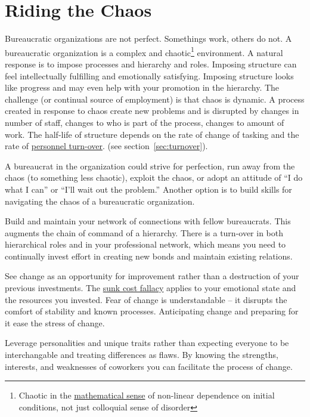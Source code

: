 \section{Riding the Chaos}

Bureaucratic organizations are not perfect. Somethings work, others do not. A bureaucratic organization is a complex and chaotic\footnote{Chaotic in the \href{https://en.wikipedia.org/wiki/Chaos_theory}{mathematical sense} of non-linear dependence on initial conditions, not just colloquial sense of disorder} environment. A natural response is to impose processes and hierarchy and roles. Imposing structure can feel intellectually fulfilling and emotionally satisfying. Imposing structure looks like progress and may even help with your promotion in the hierarchy. The challenge (or continual source of employment) is that chaos is dynamic. A process created in response to chaos create new problems and is disrupted by changes in number of staff, changes to who is part of the process, changes to amount of work. The half-life of structure depends on the rate of change of tasking and the rate of \hyperref[sec:turnover]{personnel turn-over}. 
\ifsectionref
(see section~\ref{sec:turnover}).
\fi

A bureaucrat in the organization could strive for perfection, run away from the chaos (to something less chaotic), exploit the chaos, or adopt an attitude of ``I do what I can'' or ``I'll wait out the problem.'' 
Another option is to build skills for navigating the chaos of a bureaucratic organization.

Build and maintain your network of connections with fellow bureaucrats. 
This augments the chain of command of a hierarchy. There is a turn-over in both hierarchical roles and in your professional network, which means you need to continually invest effort in creating new bonds and maintain existing relations. 

See change as an opportunity for improvement rather than a destruction of your previous investments. The \href{https://en.wikipedia.org/wiki/Sunk_cost}{sunk cost fallacy} applies to your emotional state and the resources you invested. Fear of change is understandable -- it disrupts the comfort of stability and known processes. Anticipating change and preparing for it ease the stress of change.

Leverage personalities and unique traits rather than expecting everyone to be interchangable and treating differences as flaws. 
By knowing the strengths, interests, and weaknesses of coworkers you can facilitate the process of change. 